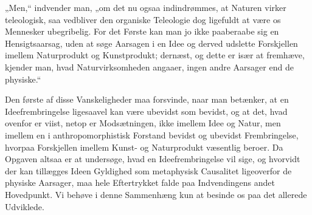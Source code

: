\documentclass[12pt,a4paper]{book}
\begin{document}
„Men,“ indvender man, „om det nu ogsaa indindrømmes, at Naturen virker
teleologisk, saa vedbliver den organiske Teleologie dog ligefuldt at være os
Mennesker ubegribelig. For det Første kan man jo ikke paaberaabe sig en
Hensigtsaarsag, uden at søge Aarsagen i en Idee og derved udslette Forskjellen
imellem Naturprodukt og Kunstprodukt; dernæst, og dette er især at fremhæve,
kjender man, hvad Naturvirksomheden angaaer, ingen andre Aarsager end de
physiske.“

Den første af disse Vanskeligheder maa forsvinde, naar man betænker, at en
Ideefrembringelse ligesaavel kan være ubevidst som bevidst, og at det, hvad
ovenfor er viist, netop er Modsætningen, ikke imellem Idee og Natur, men
imellem en i anthropomorphistisk Forstand bevidst og ubevidst Frembringelse,
hvorpaa Forskjellen imellem Kunst- og Naturprodukt væsentlig beroer. Da Opgaven
altsaa er at undersøge, hvad en Ideefrembringelse vil sige, og hvorvidt der kan
tillægges Ideen Gyldighed som metaphysisk Causalitet ligeoverfor de physiske
Aarsager, maa hele Eftertrykket falde paa Indvendingens andet Hovedpunkt. Vi
behøve i denne Sammenhæng kun at besinde os paa det allerede Udviklede.
\end{document}
